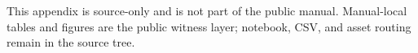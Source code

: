 
\noindent This appendix is source-only and is not part of the public manual. Manual-local tables and figures are the public witness layer; notebook, CSV, and asset routing remain in the source tree.
